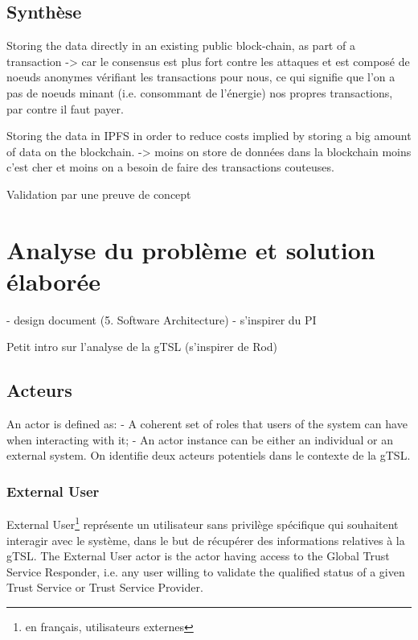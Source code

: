 \documentclass{tnreport}
\begin{document}
\section{Synthèse}

Storing the data directly in an existing public block-chain, as part of a transaction
-> car le consensus est plus fort contre les attaques et est composé de noeuds anonymes vérifiant les transactions pour nous, ce qui signifie que l'on a pas de noeuds minant (i.e. consommant de l'énergie) nos propres transactions, par contre il faut payer.

Storing the data in IPFS in order to reduce costs implied by storing a big amount of data on the blockchain.
-> moins on store de données dans la blockchain moins c'est cher et moins on a besoin de faire des transactions couteuses.

Validation par une preuve de concept

\chapter{Analyse du problème et solution élaborée}
\label{sec:analyse}

- design document (5. Software Architecture)
- s'inspirer du PI

Petit intro sur l'analyse de la gTSL (s'inspirer de Rod)


\section{Acteurs}

An actor is defined as:
- A coherent set of roles that users of the system can have when interacting with it;
- An actor instance can be either an individual or an external system.
On identifie deux acteurs potentiels dans le contexte de la gTSL.

\subsection{External User}

External User\footnote{en français, utilisateurs externes} représente un utilisateur sans privilège spécifique qui souhaitent interagir avec le système, dans le but de récupérer des informations relatives à la gTSL.
The External User actor is the actor having access to the Global Trust Service Responder, i.e. any user willing to validate the qualified status of a given Trust Service or Trust Service Provider.
\end{document}
